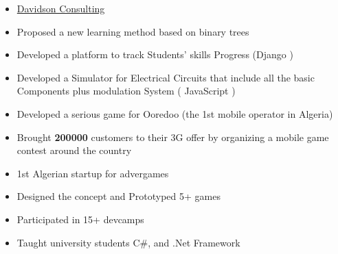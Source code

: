 \documentclass[10pt,a4paper,ragged2e,withhyper]{altacv}
\begin{document}
\begin{paracol}{2}
\begin{itemize}
    \item \href{https://www.davidson.group}{Davidson Consulting}
  \end{itemize}
  \divider
  \begin{itemize}
    \item Proposed a new learning method based on binary trees
    \item Developed a platform to track Students' skills Progress (Django )
    \item Developed a Simulator for Electrical Circuits that include all the basic Components plus modulation System ( JavaScript )
  \end{itemize}
  \divider
  \newpage
  \medskip
  \begin{itemize}
    \item Developed a serious game for Ooredoo (the 1st mobile operator in Algeria)
    \item Brought \textbf{200000} customers to their 3G offer by organizing a mobile game contest around the country
  \end{itemize}



  \begin{itemize}
    \item 1st Algerian startup for advergames
    \item Designed the concept and Prototyped 5+ games
  \end{itemize}


  \divider

  \begin{itemize}
    \item Participated in 15+ devcamps
    \item Taught university students C\#, and .Net Framework
  \end{itemize}


\end{paracol}
\end{document}
